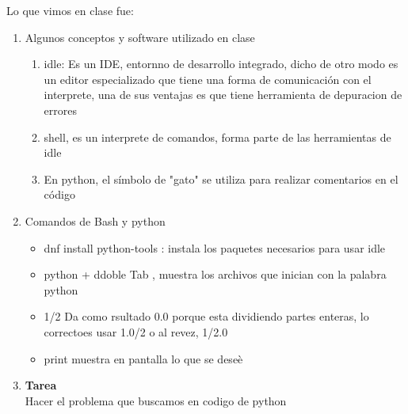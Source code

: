 \documentclass[letterpaper, 12pt, oneside]{article}%
\begin{document}
Lo que vimos en clase fue:%
\begin{enumerate}%
	\item Algunos conceptos y software utilizado en clase%
		\begin{enumerate}
			\item idle: Es un IDE, entornno de desarrollo integrado, dicho de otro modo es un editor especializado que tiene una forma de comunicación con el interprete, una de sus ventajas es que tiene herramienta de depuracion de errores
			\item shell, es un interprete de comandos, forma parte de las herramientas de idle
			\item En python, el símbolo de "gato" se utiliza para realizar comentarios en el código
		\end{enumerate}
	
	\item Comandos de Bash y python %
	\begin{itemize}%
		\item dnf install python-tools : instala los paquetes necesarios para usar idle
		\item python + ddoble Tab , muestra los archivos que inician con la palabra python
		\item 1/2 Da como rsultado 0.0 porque esta dividiendo partes enteras, lo correctoes usar 1.0/2 o al revez, 1/2.0
		\item print muestra en pantalla lo que se deseè
		
				
	\end{itemize}%
	
	\item \textbf{Tarea}
	\\
	Hacer el problema que buscamos en codigo de python
		
	
\end{enumerate}%
	
\end{document}
